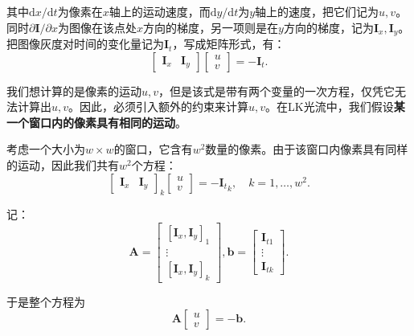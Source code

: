其中$\mathrm{d}x / \mathrm{d}t$为像素在$x$轴上的运动速度，而$\mathrm{d}y/\mathrm{d}t$为$y$轴上的速度，把它们记为$u,v$。同时$\partial \bm{I}/{\partial x}$为图像在该点处$x$方向的梯度，另一项则是在$y$方向的梯度，记为$\bm{I}_x, \bm{I}_y$。把图像灰度对时间的变化量记为$\bm{I}_t$，写成矩阵形式，有：
\begin{equation}
\left[ {\begin{array}{*{20}{c}}
	{{ \bm{I}_x}}&{{ \bm{I}_y}}
	\end{array}} \right]\left[ \begin{array}{l}
u\\
v
\end{array} \right] =  - {\bm{I}_t}.
\end{equation}

我们想计算的是像素的运动$u,v$，但是该式是带有两个变量的一次方程，仅凭它无法计算出$u,v$。因此，必须引入额外的约束来计算$u,v$。在LK光流中，我们假设\textbf{某一个窗口内的像素具有相同的运动}。

考虑一个大小为$w \times w$的窗口，它含有$w^2$数量的像素。由于该窗口内像素具有同样的运动，因此我们共有$w^2$个方程：
\begin{equation}
\left[ {\begin{array}{*{20}{c}}
	{{ \bm{I}_x}}&{{ \bm{I}_y}}
	\end{array}} \right]_k
\left[ \begin{array}{l}
u\\
v
\end{array} \right] =  - {\bm{I}_t}_k, \quad k=1, \ldots, w^2.
\end{equation}

记：
\begin{equation}
\bm{A} = \left[ {\begin{array}{*{20}{c}}
	{{{\left[ {{\bm{I}_x},{\bm{I}_y}} \right]}_1}}\\
	\vdots \\
	{{{\left[ {{\bm{I}_x},{\bm{I}_y}} \right]}_k}}
	\end{array}} \right],\bm{b} = \left[ {\begin{array}{*{20}{c}}
	{{ \bm{I}_{t1}}}\\
	\vdots \\
	{{ \bm{I}_{tk}}}
	\end{array}} \right].
\end{equation}

于是整个方程为
\begin{equation}
\bm{A}\left[ \begin{array}{l}
u\\
v
\end{array} \right] =  - \bm{b}.
\end{equation}

